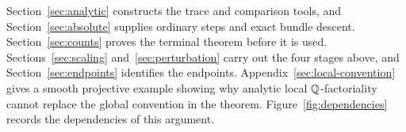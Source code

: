 Section~\ref{sec:analytic} constructs the trace and comparison tools,
and Section~\ref{sec:absolute} supplies ordinary steps and exact bundle
descent. Section~\ref{sec:counts} proves the terminal theorem before
it is used. Sections~\ref{sec:scaling} and~\ref{sec:perturbation}
carry out the four stages above, and Section~\ref{sec:endpoints}
identifies the endpoints. Appendix~\ref{sec:local-convention} gives
a smooth projective example showing why analytic local
$\mathbb Q$-factoriality cannot replace the global convention in the theorem.
Figure~\ref{fig:dependencies} records the dependencies of this argument.


